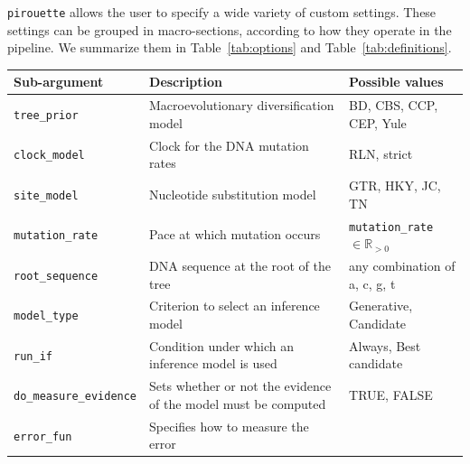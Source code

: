 \verb;pirouette; allows the user to specify a wide variety of custom settings. 
These settings can be grouped in macro-sections, 
according to how they operate in the pipeline. 
We summarize them in Table~\ref{tab:options} and Table~\ref{tab:definitions}.

\begin{table}
\centering
  \begin{tabular}{|p{3.4cm}|p{9.7cm}|p{4.5cm}@{}|}
    \hline
    \centering
    \textbf{Sub-argument} & 
    \textbf{Description} &
    \textbf{Possible values} \\ 
    \hline
    \verb;tree_prior; &
    Macroevolutionary diversification model &
    BD, CBS, CCP, CEP, Yule \\
    \verb;clock_model; &
    Clock for the DNA mutation rates &
    RLN, strict \\
    \verb;site_model; &
    Nucleotide substitution model &
    GTR, HKY, JC, TN \\
    \verb;mutation_rate; &
    Pace at which mutation occurs &
    \verb;mutation_rate; $\in \mathbb{R}_{>0}$\\
    \verb;root_sequence; &
    DNA sequence at the root of the tree &
    any combination of a, c, g, t \\
    \verb;model_type; &
    Criterion to select an inference model &
    Generative, Candidate \\
    \verb;run_if; &
    Condition under which an inference model is used &
    Always, Best candidate \\
    \verb;do_measure_evidence; &
    Sets whether or not the evidence of the model must be computed &
    TRUE, FALSE \\
    \verb;error_fun; &
    Specifies how to measure the error &

\end{tabular}
\end{table}
